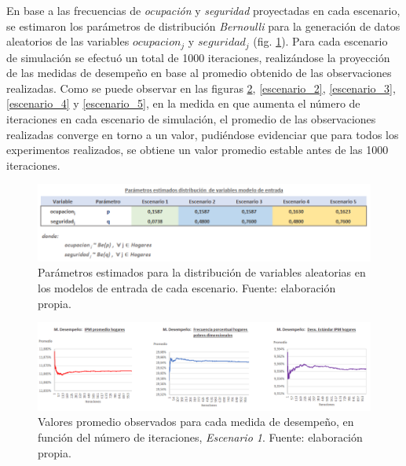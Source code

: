 \documentclass[12pt,letterpaper,spanish]{article}
\begin{document}
En base a las frecuencias de \textit{ocupación} y \textit{seguridad} proyectadas en cada escenario, se estimaron los parámetros de distribución \textit{Bernoulli} para la generación de datos aleatorios de las variables $ocupacion_j$ y $seguridad_j$ (fig. \ref{parametros_pq}). Para cada escenario de simulación se efectuó un total de 1000 iteraciones, realizándose la proyección de las medidas de desempeño en base al promedio obtenido de las observaciones realizadas. Como se puede observar en las figuras \ref{escenario_1}, \ref{escenario_2}, \ref{escenario_3}, \ref{escenario_4} y \ref{escenario_5}, en la medida en que aumenta el número de iteraciones en cada escenario de simulación, el promedio de las observaciones realizadas converge en torno a un valor, pudiéndose evidenciar que para todos los experimentos realizados, se obtiene un valor promedio estable antes de las 1000 iteraciones.


\begin{figure}[H]
    \centering
    \includegraphics[width=\textwidth]{Max/parametros_bernoulli.png}
    \caption{Parámetros estimados para la distribución de variables aleatorias en los modelos de entrada de cada escenario. Fuente: elaboración propia.}
    \label{parametros_pq}
\end{figure}






\begin{figure}[H]
    \centering
    \includegraphics[width=\textwidth]{Max/grafico_ENUSC_Escenario1.png}
    \caption{Valores promedio observados para cada medida de desempeño, en función del número de iteraciones, \textit{Escenario 1}. Fuente: elaboración propia.}
    \label{escenario_1}
\end{figure}
\end{document}
